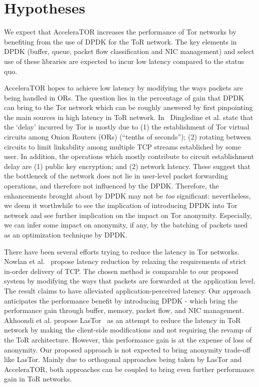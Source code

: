 \section{Hypotheses}
\label{sec:hypotheses}

We expect that AcceleraTOR increases the performance of Tor networks by benefiting from the use of DPDK for the ToR network. The key elements in DPDK (buffer, queue, packet flow classification and NIC management) and select use of these libraries are expected to incur low latency compared to the status quo.

AcceleraTOR hopes to achieve low latency by modifying the ways packets are being handled in ORs. The question lies in the percentage of gain that DPDK can bring to the Tor network which can be roughly answered by first pinpointing the main sources in high latency in ToR network. In~\cite{Dingledine:2004:TSO:1251375.1251396} Dingledine et al. state that the `delay' incurred by Tor is mostly due to (1) the establishment of Tor virtual circuits among Onion Routers (ORs) (``tenths of seconds''); (2) rotating between circuits to limit linkability among multiple TCP streams established by some user. In addition, the operations which mostly contribute to circuit establishment delay are (1) public key encryption; and (2) network latency. These suggest that the bottleneck of the network does not lie in user-level packet forwarding operations, and therefore not influenced by the DPDK. Therefore, the enhancements brought about by DPDK may not be \textit{too} significant: nevertheless, we deem it worthwhile to see the implication of introducing DPDK into Tor network and see further implication on the impact on Tor anonymity. Especially, we can infer some impact on anonymity, if any, by the batching of packets used as an optimization technique by DPDK. 

There have been several efforts trying to reduce the latency in Tor networks. Nowlan et al.~\cite{179191} propose latency reduction by relaxing the requirements of strict in-order delivery of TCP. The chosen method is comparable to our proposed system by modifying the ways that packets are forwarded at the application level. The result claims to have alleviated application-perceived latency. Our approach anticipates the performance benefit by introducing DPDK - which bring the performance gain through buffer, memory, packet flow, and NIC management. Akhoondi et al. propose LasTor~\cite{Akhoondi:2012:LLA:2310656.2310712} as an attempt to reduce the latency in ToR network by making the client-side modifications and not requiring the revamp of the ToR architecture. However, this performance gain is at the expense of loss of anonymity. Our proposed  approach is not expected to bring anonymity trade-off like LasTor. Mainly due to orthogonal approaches being taken by LasTor and AcceleraTOR, both approaches can be coupled to bring even further performance gain in ToR networks. 
